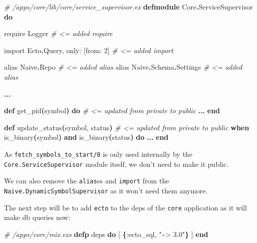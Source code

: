\documentclass[
  oneside]{book}
\newenvironment{Shaded}{\begin{snugshade}}{\end{snugshade}}
\newcommand{\CommentTok}[1]{\textcolor[rgb]{0.56,0.35,0.01}{\textit{#1}}}
\newcommand{\ConstantTok}[1]{\textcolor[rgb]{0.56,0.35,0.01}{#1}}
\newcommand{\DecValTok}[1]{\textcolor[rgb]{0.00,0.00,0.81}{#1}}
\newcommand{\FunctionTok}[1]{\textcolor[rgb]{0.13,0.29,0.53}{\textbf{#1}}}
\newcommand{\ImportTok}[1]{#1}
\newcommand{\KeywordTok}[1]{\textcolor[rgb]{0.13,0.29,0.53}{\textbf{#1}}}
\newcommand{\NormalTok}[1]{#1}
\newcommand{\OperatorTok}[1]{\textcolor[rgb]{0.81,0.36,0.00}{\textbf{#1}}}
\newcommand{\OtherTok}[1]{\textcolor[rgb]{0.56,0.35,0.01}{#1}}
\newcommand{\StringTok}[1]{\textcolor[rgb]{0.31,0.60,0.02}{#1}}
\newcommand{\VariableTok}[1]{\textcolor[rgb]{0.00,0.00,0.00}{#1}}
\begin{document}
\begin{Shaded}
\begin{Highlighting}[]
\CommentTok{\# /apps/core/lib/core/service\_supervisor.ex}
\KeywordTok{defmodule} \ConstantTok{Core}\OperatorTok{.}\ConstantTok{ServiceSupervisor} \KeywordTok{do}

  \ImportTok{require} \ConstantTok{Logger}                     \CommentTok{\# \textless{}= added require}

  \ImportTok{import} \ConstantTok{Ecto}\OperatorTok{.}\ConstantTok{Query}\NormalTok{, }\VariableTok{only:} \OtherTok{[}\VariableTok{from:} \DecValTok{2}\OtherTok{]} \CommentTok{\# \textless{}= added import}

  \ImportTok{alias} \ConstantTok{Naive}\OperatorTok{.}\ConstantTok{Repo}                   \CommentTok{\# \textless{}= added alias}
  \ImportTok{alias} \ConstantTok{Naive}\OperatorTok{.}\ConstantTok{Schema}\OperatorTok{.}\ConstantTok{Settings}        \CommentTok{\# \textless{}= added alias}

  \OperatorTok{...}

  \KeywordTok{def}\NormalTok{ get\_pid}\FunctionTok{(}\NormalTok{symbol}\FunctionTok{)} \KeywordTok{do} \CommentTok{\# \textless{}= updated from private to public}
    \OperatorTok{...}
  \KeywordTok{end}

  \KeywordTok{def}\NormalTok{ update\_status}\FunctionTok{(}\NormalTok{symbol, status}\FunctionTok{)} \CommentTok{\# \textless{}= updated from private to public}
      \KeywordTok{when}\NormalTok{ is\_binary}\FunctionTok{(}\NormalTok{symbol}\FunctionTok{)} \KeywordTok{and}\NormalTok{ is\_binary}\FunctionTok{(}\NormalTok{status}\FunctionTok{)} \KeywordTok{do}
    \OperatorTok{...}
  \KeywordTok{end}
\end{Highlighting}
\end{Shaded}

As \texttt{fetch\_symbols\_to\_start/0} is only used internally by the \texttt{Core.ServiceSupervisor} module itself, we don't need to make it public.

We can also remove the \texttt{alias}es and \texttt{import} from the \texttt{Naive.DynamicSymbolSupervisor} as it won't need them anymore.

The next step will be to add \texttt{ecto} to the deps of the \texttt{core} application as it will make db queries now:

\begin{Shaded}
\begin{Highlighting}[]
  \CommentTok{\# /apps/core/mix.exs}
  \KeywordTok{defp}\NormalTok{ deps }\KeywordTok{do}
    \OtherTok{[}
      \FunctionTok{\{}\VariableTok{:ecto\_sql}\NormalTok{, }\StringTok{"\textasciitilde{}\textgreater{} 3.0"}\FunctionTok{\}}
    \OtherTok{]}
  \KeywordTok{end}
\end{Highlighting}
\end{Shaded}
\end{document}
